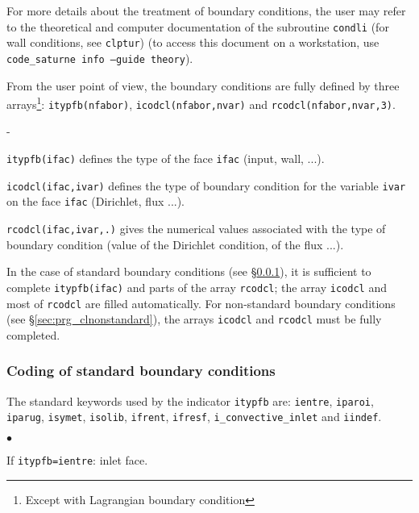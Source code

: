 {{{For more details about the treatment of boundary conditions, the user
may refer to the theoretical and computer documentation \cite{theory} of
the subroutine \texttt{condli} (for wall conditions, see
\texttt{clptur}) (to access this document on a workstation, use
\mbox{\texttt{code\_saturne~info --guide theory}}).

From the user point of view, the boundary conditions are fully
defined by three arrays\footnote{Except with Lagrangian boundary condition}:
\texttt{itypfb(nfabor)},
\texttt{icodcl(nfabor,nvar)} and
\texttt{rcodcl(nfabor,nvar,3)}.
\begin{list}{-}{}
\item \texttt{itypfb(ifac)} defines the type of the face \texttt{ifac}
      (input, wall, ...).
\item \texttt{icodcl(ifac,ivar)} defines the type of boundary
      condition for the variable \texttt{ivar} on the face \texttt{ifac}
      (Dirichlet, flux ...).
\item \texttt{rcodcl(ifac,ivar,.)} gives the numerical values associated with the
      type of boundary condition (value of the Dirichlet condition, of the flux ...).
\end{list}

In the case of standard boundary conditions (see
\S\ref{sec:prg_clstandard}), it is sufficient to complete \texttt{itypfb(ifac)} and
parts of the array \texttt{rcodcl}; the array \texttt{icodcl} and most of \texttt{rcodcl} are filled automatically. For non-standard boundary
conditions (see \S\ref{sec:prg_clnonstandard}), the arrays \texttt{icodcl} and
\texttt{rcodcl} must be fully completed.

\subsubsection{Coding of standard boundary conditions}
\label{sec:prg_clstandard}%
The standard keywords used by the indicator \texttt{itypfb} are:
\texttt{ientre}, \texttt{iparoi},
\texttt{iparug}, \texttt{isymet},
\texttt{isolib}, \texttt{ifrent}, \texttt{ifresf},
\texttt{i\_convective\_inlet} and \texttt{iindef}.

\begin{list}{$\bullet$}{}
\item If \texttt{itypfb=ientre}: inlet face.


\end{list}}}}
